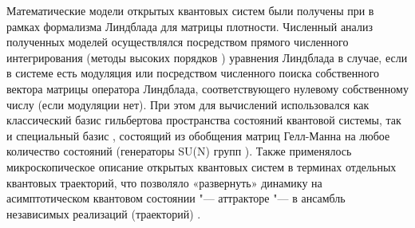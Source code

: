 {\methods} 
Математические модели открытых квантовых систем были получены при в рамках формализма Линдблада \autocite{Lindblad1976, Gorini1976, book2007} для матрицы плотности.
Численный анализ полученных моделей осуществлялся посредством прямого численного интегрирования (методы высоких порядков \autocite{Lambert1991}) уравнения Линдблада в случае, если в системе есть модуляция или посредством численного поиска собственного вектора матрицы оператора Линдблада, соответствующего нулевому собственному числу  (если модуляции нет). При этом для вычислений использовался как классический базис гильбертова пространства состояний квантовой системы, так и специальный базис \cite{Liniov2019}, состоящий из обобщения матриц Гелл-Манна \autocite{GellMann1962} на любое количество состояний \autocite{Lendi1987} (генераторы SU(N) групп \autocite{Georgi2018}).
Также применялось микроскопическое описание открытых квантовых систем в терминах отдельных квантовых траекторий, что позволяло  «развернуть» динамику на асимптотическом квантовом состоянии "--- аттракторе "--- в ансамбль независимых реализаций (траекторий) \autocite{Dalibard1992, Dum1992, Plenio1998, Volokitin2017}.

